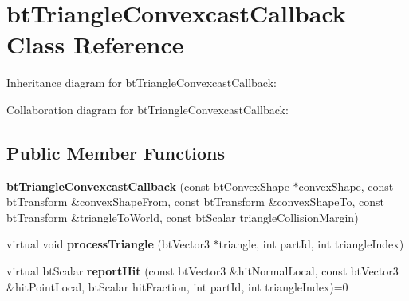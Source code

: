\hypertarget{classbt_triangle_convexcast_callback}{\section{bt\+Triangle\+Convexcast\+Callback Class Reference}
\label{classbt_triangle_convexcast_callback}
}


Inheritance diagram for bt\+Triangle\+Convexcast\+Callback\+:


Collaboration diagram for bt\+Triangle\+Convexcast\+Callback\+:
\subsection*{Public Member Functions}
\begin{DoxyCompactItemize}
\item 
\hypertarget{classbt_triangle_convexcast_callback_ae34f524d20db09e0c81f7f98afc77497}{{\bfseries bt\+Triangle\+Convexcast\+Callback} (const bt\+Convex\+Shape $\ast$convex\+Shape, const bt\+Transform \&convex\+Shape\+From, const bt\+Transform \&convex\+Shape\+To, const bt\+Transform \&triangle\+To\+World, const bt\+Scalar triangle\+Collision\+Margin)}\label{classbt_triangle_convexcast_callback_ae34f524d20db09e0c81f7f98afc77497}

\item 
\hypertarget{classbt_triangle_convexcast_callback_a2927a686e707e8ed885433f120bc5e32}{virtual void {\bfseries process\+Triangle} (bt\+Vector3 $\ast$triangle, int part\+Id, int triangle\+Index)}\label{classbt_triangle_convexcast_callback_a2927a686e707e8ed885433f120bc5e32}

\item 
\hypertarget{classbt_triangle_convexcast_callback_a74bdd1264324629f7f44e305ec3187a2}{virtual bt\+Scalar {\bfseries report\+Hit} (const bt\+Vector3 \&hit\+Normal\+Local, const bt\+Vector3 \&hit\+Point\+Local, bt\+Scalar hit\+Fraction, int part\+Id, int triangle\+Index)=0}\label{classbt_triangle_convexcast_callback_a74bdd1264324629f7f44e305ec3187a2}

\end{DoxyCompactItemize}
